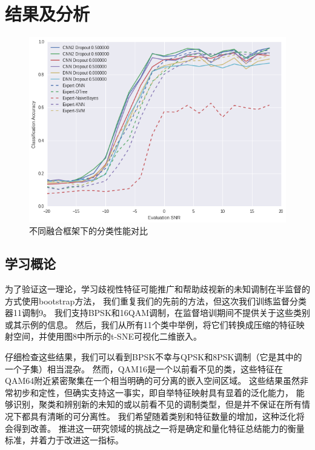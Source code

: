 \section{结果及分析}

\begin{figure}[!h]
	\centering
	\includegraphics[scale=0.3]{figures/chapter_3/result}
	\caption{不同融合框架下的分类性能对比}\label{fig_2_2}
\end{figure}

\subsection{学习概论}
为了验证这一理论，学习歧视性特征可能推广和帮助歧视新的未知调制在半监督的方式使用bootstrap方法，
我们重复我们的先前的方法，但这次我们训练监督分类器11调制9。
我们支持BPSK和16QAM调制，在监督培训期间不提供关于这些类别或其示例的信息。
然后，我们从所有11个类中举例，将它们转换成压缩的特征映射空间，并使用图8中所示的t-SNE可视化二维嵌入。\par

仔细检查这些结果，我们可以看到BPSK不幸与QPSK和8PSK调制（它是其中的一个子集）相当混杂。
然而，QAM16是一个以前看不见的类，这些特征在QAM64附近紧密聚集在一个相当明确的可分离的嵌入空间区域。
这些结果虽然非常初步和定性，但确实支持这一事实，即自举特征映射具有显着的泛化能力，
能够识别，聚类和辨别新的未知的或以前看不见的调制类型，但是并不保证在所有情况下都具有清晰的可分离性。
我们希望随着类别和特征数量的增加，这种泛化将会得到改善。
推进这一研究领域的挑战之一将是确定和量化特征总结能力的衡量标准，并着力于改进这一指标。\par

